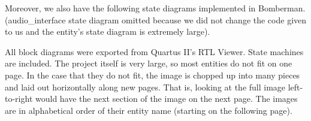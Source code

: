 \documentclass[10pt,a4paper]{article}
\newif\ifrenderBig
\begin{document}
Moreover, we also have the following state diagrams implemented in Bomberman. (audio\_interface state diagram omitted because we did not change the code given to us and the entity's state diagram is extremely large).

\ifrenderBig
All block diagrams were exported from Quartus II's RTL Viewer. State machines are included. The project itself is very large, so most entities do not fit on one page. In the case that they do not fit, the image is chopped up into many pieces and laid out horizontally along new pages. That is, looking at the full image left-to-right would have the next section of the image on the next page. The images are in alphabetical order of their entity name (starting on the following page).
\end{document}
